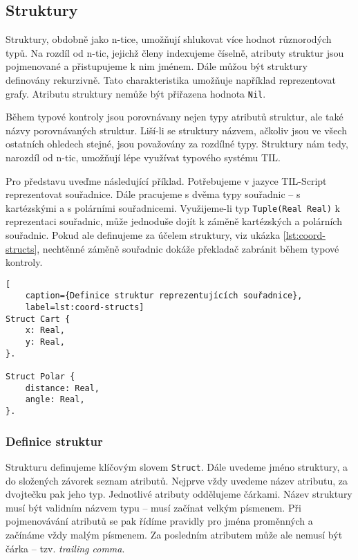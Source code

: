 \subsection{Struktury} \label{structs}

Struktury, obdobně jako n-tice, umožňují shlukovat více hodnot různorodých typů. Na rozdíl od n-tic,
jejichž členy indexujeme číselně, atributy struktur jsou pojmenované a přistupujeme k nim jménem.
Dále můžou být struktury definovány rekurzivně. Tato charakteristika umožňuje například
reprezentovat grafy. Atributu struktury nemůže být přiřazena hodnota \lstinline{Nil}.

Během typové kontroly jsou porovnávany nejen typy atributů struktur, ale také názvy porovnávaných
struktur. Liší-li se struktury názvem, ačkoliv jsou ve všech ostatních ohledech stejné, jsou
považovány za rozdílné typy. Struktury nám tedy, narozdíl od n-tic, umožňují lépe využívat typového
systému TIL.

Pro představu uveďme následující příklad. Potřebujeme v jazyce TIL-Script reprezentovat souřadnice.
Dále pracujeme s dvěma typy souřadnic -- s kartézskými a s polárními souřadnicemi. Využijeme-li
typ \lstinline{Tuple(Real Real)} k reprezentaci souřadnic, může jednoduše dojít k záměně
kartézských a polárních souřadnic. Pokud ale definujeme za účelem struktury, viz ukázka
\ref{lst:coord-structs}, nechtěnné záměně souřadnic dokáže překladač zabránit během typové
kontroly.

\begin{lstlisting}[
    caption={Definice struktur reprezentujících souřadnice},
    label=lst:coord-structs]
Struct Cart {
    x: Real,
    y: Real,
}.

Struct Polar {
    distance: Real,
    angle: Real,
}.
\end{lstlisting}

\subsubsection{Definice struktur}

Strukturu definujeme klíčovým slovem \lstinline{Struct}. Dále uvedeme jméno struktury, a do
složených závorek seznam atributů. Nejprve vždy uvedeme název atributu, za dvojtečku pak jeho typ.
Jednotlivé atributy oddělujeme čárkami. Název struktury musí být validním názvem typu -- musí
začínat velkým písmenem. Při pojmenovávání atributů se pak řídíme pravidly pro jména proměnných
a začínáme vždy malým písmenem. Za posledním atributem může ale nemusí být čárka -- tzv.
\textit{trailing comma}.

